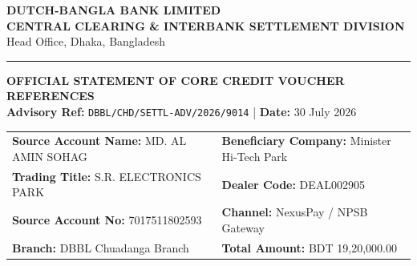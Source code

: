 \documentclass[11pt, a4paper]{article}
\begin{document}
\begin{center}
    {\LARGE \bfseries \color{dbblblue} DUTCH-BANGLA BANK LIMITED} \\[3pt]
    {\small \bfseries CENTRAL CLEARING \& INTERBANK SETTLEMENT DIVISION} \\[2pt]
    {\footnotesize Head Office, Dhaka, Bangladesh} \\
    \vspace{6pt}
    \rule{\textwidth}{1pt}
\end{center}

\vspace{8pt}

\begin{center}
    {\large \bfseries \color{dbblblue} OFFICIAL STATEMENT OF CORE CREDIT VOUCHER REFERENCES} \\
    \vspace{4pt}
    {\small \textbf{Advisory Ref:} \texttt{DBBL/CHD/SETTL-ADV/2026/9014} \quad | \quad \textbf{Date:} 30 July 2026}
\end{center}

\vspace{10pt}

\noindent
\begin{tabularx}{\textwidth}{@{} X X @{}}
\toprule
\textbf{Source Account Name:} MD. AL AMIN SOHAG & \textbf{Beneficiary Company:} Minister Hi-Tech Park \\
\textbf{Trading Title:} S.R. ELECTRONICS PARK & \textbf{Dealer Code:} DEAL002905 \\
\textbf{Source Account No:} 7017511802593 & \textbf{Channel:} NexusPay / NPSB Gateway \\
\textbf{Branch:} DBBL Chuadanga Branch & \textbf{Total Amount:} BDT 19,20,000.00 \\
\bottomrule
\end{tabularx}

\vspace{15pt}


\vspace{8pt}
\end{document}
